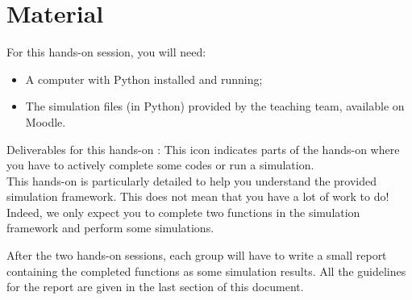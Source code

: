 \section*{Material}

\begin{comment}[couleur = gray!20, arrondi = 0.2, logo=\bcinfo]{}
\vspace{0.2cm}
\end{comment}
For this hands-on session, you will need:
\begin{itemize}
    \item A computer with Python installed and running;
    \item The simulation files (in Python) provided by the teaching team, available on Moodle.
\end{itemize}
\begin{bclogo}[couleur = gray!20, arrondi = 0.2, logo=\bcinfo]{Deliverables for this hands-on}
\bccrayon: This icon indicates parts of the hands-on where you have to actively complete some codes or run a simulation.\\

This hands-on is particularly detailed to help you understand the provided simulation framework. This does not mean that you have a lot of work to do! Indeed, we only expect you to complete two functions in the simulation framework and perform some simulations.

After the two hands-on sessions, each group will have to write a small report containing the completed functions as some simulation results. All the guidelines for the report are given in the last section of this document.

\end{bclogo}
